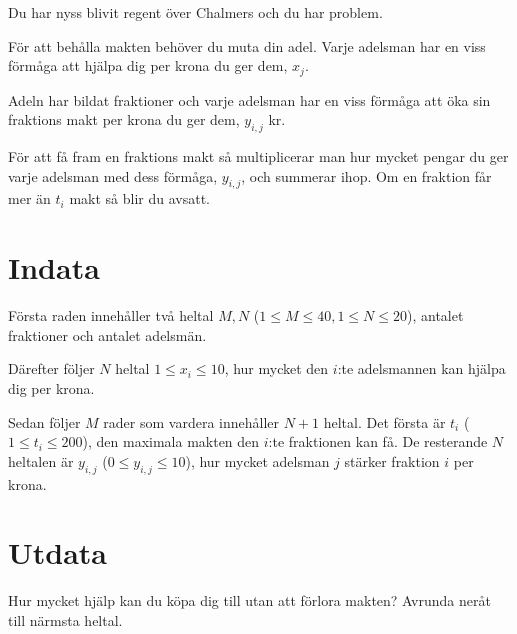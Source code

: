 Du har nyss blivit regent över Chalmers och du har problem.

För att behålla makten behöver du muta din adel. Varje adelsman har en viss förmåga att hjälpa dig per krona du ger dem, $x_j$.

Adeln har bildat fraktioner och varje adelsman har en viss förmåga att öka sin fraktions makt per krona du ger dem, $y_{i,j}$ kr.

För att få fram en fraktions makt så multiplicerar man hur mycket pengar du ger varje adelsman med dess förmåga, $y_{i,j}$,
och summerar ihop. Om en fraktion får mer än $t_i$ makt så blir du avsatt.

\section*{Indata}
Första raden innehåller två heltal $M, N$ ($1 \leq M \leq 40, 1 \leq N \leq 20$), antalet fraktioner och antalet adelsmän.

Därefter följer $N$ heltal $1 \leq x_i \leq 10$, hur mycket den $i$:te adelsmannen kan hjälpa dig per krona.

Sedan följer $M$ rader som vardera innehåller $N+1$ heltal. Det första är $t_i$ ($1 \leq t_i \leq 200$), den maximala makten den
$i$:te fraktionen kan få. De resterande $N$ heltalen är $y_{i,j}$ ($0 \leq y_{i,j} \leq 10$), hur mycket adelsman $j$ stärker fraktion $i$ per krona.

\section*{Utdata}
Hur mycket hjälp kan du köpa dig till utan att förlora makten? Avrunda neråt till närmsta heltal.
